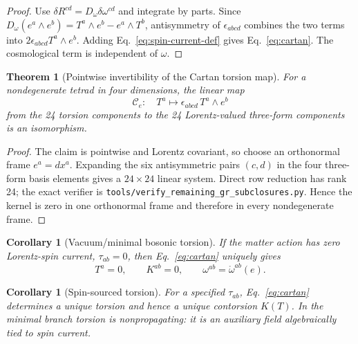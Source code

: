 \documentclass[12pt,a4paper]{article}
\newtheorem{theorem}[definition]{Theorem}
\newtheorem{corollary}[definition]{Corollary}
\theoremstyle{remark}\newtheorem{remark}[definition]{Remark}
\begin{document}
\begin{proof}
Use $\delta R^{cd}=D_\omega\delta\omega^{cd}$ and integrate by parts.  Since
$D_\omega(e^a\wedge e^b)=T^a\wedge e^b-e^a\wedge T^b$, antisymmetry of
$\epsilon_{abcd}$ combines the two terms into
$2\epsilon_{abcd}T^a\wedge e^b$.  Adding
Eq.~\eqref{eq:spin-current-def} gives Eq.~\eqref{eq:cartan}.  The cosmological
term is independent of $\omega$.
\end{proof}

\begin{theorem}[Pointwise invertibility of the Cartan torsion map]
For a nondegenerate tetrad in four dimensions, the linear map
\begin{equation}
 \mathcal C_e:\quad T^a\longmapsto
 \epsilon_{abcd}\,T^a\wedge e^b
 \label{eq:cartan-map}
\end{equation}
from the 24 torsion components to the 24 Lorentz-valued three-form components
is an isomorphism.
\end{theorem}

\begin{proof}
The claim is pointwise and Lorentz covariant, so choose an orthonormal frame
$e^a=dx^a$.  Expanding the six antisymmetric pairs $(c,d)$ in the four
three-form basis elements gives a $24\times24$ linear system.  Direct row
reduction has rank 24; the exact verifier is
\texttt{tools/verify\_remaining\_gr\_subclosures.py}.  Hence the kernel is
zero in one orthonormal frame and therefore in every nondegenerate frame.
\end{proof}

\begin{corollary}[Vacuum/minimal bosonic torsion]
If the matter action has zero Lorentz-spin current,
$\tau_{ab}=0$, then Eq.~\eqref{eq:cartan} uniquely gives
\begin{equation}
 \boxed{T^a=0,\qquad K^{ab}=0,\qquad
 \omega^{ab}=\mathring\omega^{ab}(e).}
\end{equation}
\end{corollary}

\begin{corollary}[Spin-sourced torsion]
For a specified $\tau_{ab}$, Eq.~\eqref{eq:cartan} determines a unique torsion
and hence a unique contorsion $K(T)$.  In the minimal branch torsion is
nonpropagating: it is an auxiliary field algebraically tied to spin current.
\end{corollary}
\end{document}
